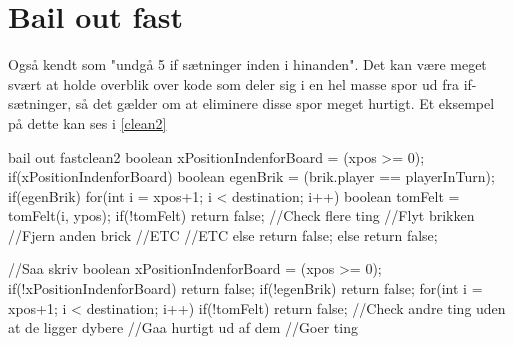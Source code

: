 \section{Bail out fast}
Også kendt som "undgå 5 if sætninger inden i hinanden". Det kan være meget svært at holde overblik over kode som deler sig i en hel masse spor ud fra if-sætninger, så det gælder om at eliminere disse spor meget hurtigt. Et eksempel på dette kan ses i \autoref{clean2}
\begin{JavaCode}{bail out fast}{clean2}
	boolean xPositionIndenforBoard = (xpos >= 0);
	if(xPositionIndenforBoard){
		boolean egenBrik = (brik.player == playerInTurn);
		if(egenBrik){
			for(int i = xpos+1; i < destination; i++){
				boolean tomFelt = tomFelt(i, ypos);
				if(!tomFelt){
					return false;
				}
			}
			//Check flere ting
			//Flyt brikken
			//Fjern anden brick
			//ETC
			//ETC
		} else {
			return false;
		}
	} else {
		return false;
	}
	
	//Saa skriv
	boolean xPositionIndenforBoard = (xpos >= 0);
	if(!xPositionIndenforBoard){
		return false;
	}
	if(!egenBrik){
		return false;
	}
	for(int i = xpos+1; i < destination; i++){
		if(!tomFelt){
			return false;
		}	
	}
	//Check andre ting uden at de ligger dybere
	//Gaa hurtigt ud af dem
	//Goer ting 
\end{JavaCode}
